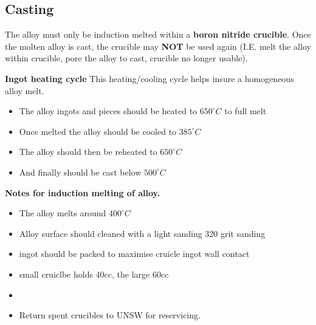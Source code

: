 \subsection{Casting}

The \MgZnCa alloy must only be induction melted within a \textbf{boron nitride crucible}. Once the molten alloy is cast, the crucible may \textbf{NOT} be used again (I.E. melt the alloy within crucible, pore the alloy to cast, crucible no longer usable). 

\textbf{Ingot heating cycle}
This heating/cooling cycle helps insure a homogeneous alloy melt.
\begin{itemize}
\item The \MgZnCa alloy ingots and pieces should be heated to $650^{\circ}C$ to full melt
\item Once melted the alloy should be cooled to $385^{\circ}C$
\item The alloy should then be reheated to $650^{\circ}C$
\item And finally should be cast below $500^{\circ}C$
\end{itemize}

\textbf{Notes for induction melting of \MgZnCa alloy.}
\begin{itemize}
\item The \MgZnCa alloy melts around $400^{\circ}C$
\item Alloy surface should cleaned with a light sanding 320 grit sanding
\item ingot should be packed to maximise cruicle ingot wall contact
\item small cruiclbe holds 40cc, the large 60cc
\item 
\item Return spent crucibles to UNSW for reservicing. 
\end{itemize}